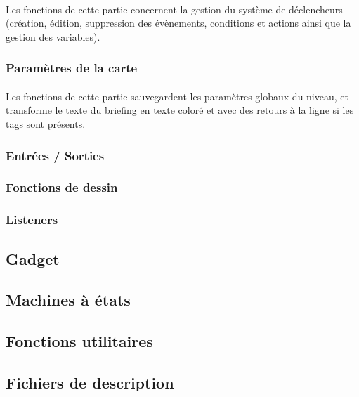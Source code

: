 \documentclass[a4paper]{article}
\begin{document}
\paragraph{}
Les fonctions de cette partie concernent la gestion du système de déclencheurs (création, édition, suppression des évènements, conditions et actions ainsi que la gestion des variables).
\subsubsection{Paramètres de la carte}
\paragraph{}
Les fonctions de cette partie sauvegardent les paramètres globaux du niveau, et transforme le texte du briefing en texte coloré et avec des retours à la ligne si les tags sont présents.
\subsubsection{Entrées / Sorties}
\subsubsection{Fonctions de dessin}
\subsubsection{Listeners\label{listeners}}
\subsection{Gadget}
\subsection{Machines à états\label{statemachine}}
\subsection{Fonctions utilitaires}
\subsection{Fichiers de description}
\end{document}
